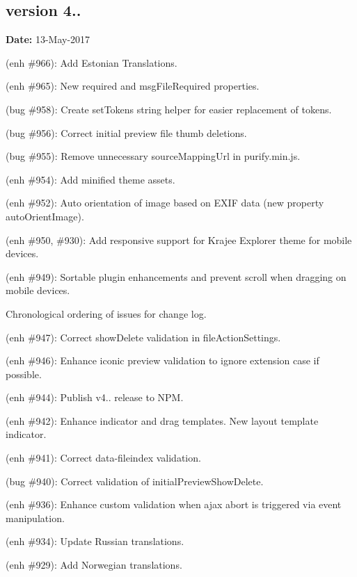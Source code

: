 \subsection*{version 4..}

{\bfseries Date\+:} 13-\/\+May-\/2017


\begin{DoxyItemize}
\item (enh \#966)\+: Add Estonian Translations.
\item (enh \#965)\+: New {\ttfamily required} and {\ttfamily msg\+File\+Required} properties.
\item (bug \#958)\+: Create {\ttfamily set\+Tokens} string helper for easier replacement of tokens.
\item (bug \#956)\+: Correct initial preview file thumb deletions.
\item (bug \#955)\+: Remove unnecessary {\ttfamily source\+Mapping\+Url} in {\ttfamily purify.\+min.\+js}.
\item (enh \#954)\+: Add minified theme assets.
\item (enh \#952)\+: Auto orientation of image based on E\+X\+IF data (new property {\ttfamily auto\+Orient\+Image}).
\item (enh \#950, \#930)\+: Add responsive support for Krajee Explorer theme for mobile devices.
\item (enh \#949)\+: Sortable plugin enhancements and prevent scroll when dragging on mobile devices.
\item Chronological ordering of issues for change log.
\item (enh \#947)\+: Correct {\ttfamily show\+Delete} validation in {\ttfamily file\+Action\+Settings}.
\item (enh \#946)\+: Enhance iconic preview validation to ignore extension case if possible.
\item (enh \#944)\+: Publish v4.. release to N\+PM.
\item (enh \#942)\+: Enhance indicator and drag templates. New layout template {\ttfamily indicator}.
\item (enh \#941)\+: Correct {\ttfamily data-\/fileindex} validation.
\item (bug \#940)\+: Correct validation of {\ttfamily initial\+Preview\+Show\+Delete}.
\item (enh \#936)\+: Enhance custom validation when ajax abort is triggered via event manipulation.
\item (enh \#934)\+: Update Russian translations.
\item (enh \#929)\+: Add Norwegian translations.

\end{DoxyItemize}
